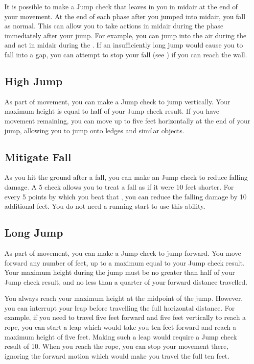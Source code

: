     It is possible to make a Jump check that leaves in you in midair at the end of your movement.
    At the end of each phase after you jumped into midair, you fall as normal.
    This can allow you to take actions in midair during the phase immediately after your jump.
    For example, you can jump into the air during the  and act in midair during the .
    If an insufficiently long jump would cause you to fall into a gap, you can attempt to stop your fall (see ) if you can reach the wall.

    \subsection{High Jump}
        As part of movement, you can make a Jump check to jump vertically.
        Your maximum height is equal to half of your Jump check result.
        If you have movement remaining, you can move up to five feet horizontally at the end of your jump, allowing you to jump onto ledges and similar objects.

    \subsection{Mitigate Fall}
        As you hit the ground after a fall, you can make an Jump check to reduce falling damage.
        A  5 check allows you to treat a fall as if it were 10 feet shorter.
        For every 5 points by which you beat that , you can reduce the falling damage by 10 additional feet.
        You do not need a running start to use this ability.

    \subsection{Long Jump}\label{Leap}
        As part of movement, you can make a Jump check to jump forward.
        You move forward any number of feet, up to a maximum equal to your Jump check result.
        Your maximum height during the jump must be no greater than half of your Jump check result, and no less than a quarter of your forward distance travelled.

        You always reach your maximum height at the midpoint of the jump.
        However, you can interrupt your leap before travelling the full horizontal distance.
        For example, if you need to travel five feet forward and five feet vertically to reach a rope, you can start a leap which would take you ten feet forward and reach a maximum height of five feet.
        Making such a leap would require a Jump check result of 10.
        When you reach the rope, you can stop your movement there, ignoring the forward motion which would make you travel the full ten feet.

